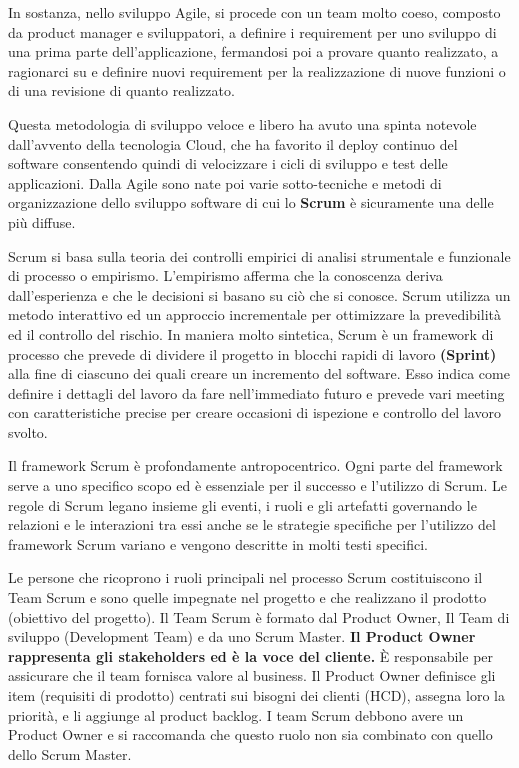 In sostanza, nello sviluppo Agile, si procede con un team molto coeso, composto da product manager e sviluppatori, a definire i requirement per uno sviluppo di una prima parte dell’applicazione, fermandosi poi a provare quanto realizzato, a ragionarci su e definire nuovi requirement per la realizzazione di nuove funzioni o di una revisione di quanto realizzato.

Questa metodologia di sviluppo veloce e libero ha avuto una spinta notevole dall’avvento della tecnologia Cloud, che ha favorito il deploy continuo del software consentendo quindi di velocizzare i cicli di sviluppo e test delle applicazioni.
Dalla Agile sono nate poi varie sotto-tecniche e metodi di organizzazione dello sviluppo software di cui lo \textbf{Scrum} è sicuramente una delle più diffuse. 

Scrum si basa sulla teoria dei controlli empirici di analisi strumentale e funzionale di processo o empirismo. L'empirismo afferma che la conoscenza deriva dall'esperienza e che le decisioni si basano su ciò che si conosce. Scrum utilizza un metodo interattivo ed un approccio incrementale per ottimizzare la prevedibilità ed il controllo del rischio.
In maniera molto sintetica, Scrum è un framework di processo che prevede di dividere il progetto in blocchi rapidi di lavoro \textbf{(Sprint)} alla fine di ciascuno dei quali creare un incremento del software. Esso indica come definire i dettagli del lavoro da fare nell'immediato futuro e prevede vari meeting con caratteristiche precise per creare occasioni di ispezione e controllo del lavoro svolto.

Il framework Scrum è profondamente antropocentrico. Ogni parte del framework serve a uno specifico scopo ed è essenziale per il successo e l'utilizzo di Scrum. Le regole di Scrum legano insieme gli eventi, i ruoli e gli artefatti governando le relazioni e le interazioni tra essi anche se le strategie specifiche per l'utilizzo del framework Scrum variano e vengono descritte in molti testi specifici.

Le persone che ricoprono i ruoli principali nel processo Scrum costituiscono il Team Scrum e sono quelle impegnate nel progetto e che realizzano il prodotto (obiettivo del progetto). Il Team Scrum è formato dal Product Owner, Il Team di sviluppo (Development Team) e da uno Scrum Master. \textbf{Il Product Owner rappresenta gli stakeholders ed è la voce del cliente.} È responsabile per assicurare che il team fornisca valore al business. Il Product Owner definisce gli item (requisiti di prodotto) centrati sui bisogni dei clienti (HCD), assegna loro la priorità, e li aggiunge al product backlog. I team Scrum debbono avere un Product Owner e si raccomanda che questo ruolo non sia combinato con quello dello Scrum Master.


